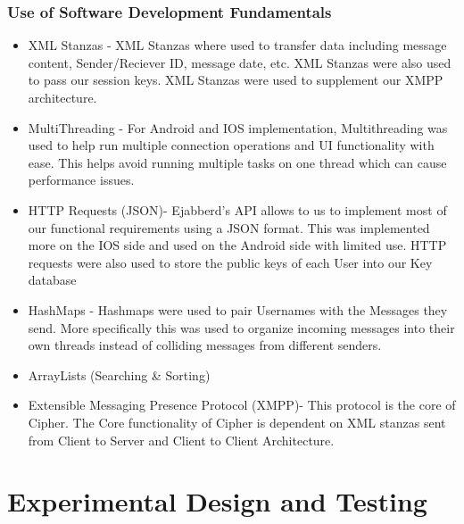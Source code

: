 \documentclass[12pt]{article}
\begin{document}
\subsubsection{Use of Software Development Fundamentals}
\begin{itemize}
\item XML Stanzas - XML Stanzas where used to transfer data including message content, Sender/Reciever ID, message date, etc. XML Stanzas were also used to pass our session keys. XML Stanzas were used to supplement our XMPP architecture.
\item MultiThreading - For Android and IOS implementation, Multithreading was used to help run multiple connection operations and UI functionality with ease. This helps avoid running multiple tasks on one thread which can cause performance issues.
\item HTTP Requests (JSON)- Ejabberd's API allows to us to implement most of our functional requirements using a JSON format. This was implemented more on the IOS side and used on the Android side with limited use. HTTP requests were also used to store the public keys of each User into our Key database 
\item HashMaps - Hashmaps were used to pair Usernames with the Messages they send. More specifically this was used to organize incoming messages into their own threads instead of colliding messages from different senders. 
\item ArrayLists (Searching & Sorting)
\item Extensible Messaging Presence Protocol (XMPP)- This protocol is the core of Cipher. The Core functionality of Cipher is dependent on XML stanzas sent from Client to Server and Client to Client Architecture.
\end{itemize}


\section{Experimental Design and Testing}\label{chap:results}
\end{document}
